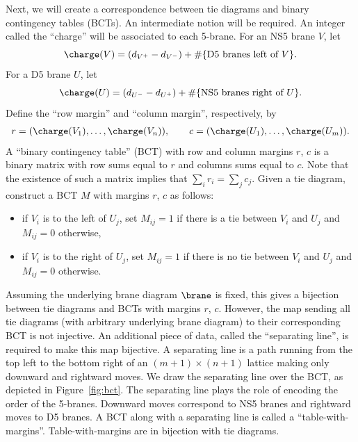 Next, we will create a correspondence between tie diagrams and binary contingency tables (BCTs). An intermediate notion will be required. An integer called the ``charge'' will be associated to each 5-brane.
For an NS5 brane $V$, let
\[
\charge(V)=
(d_{V^+}-d_{V^-})+\#\{\text{D5 branes left of $V$}\}.
\]
For a D5 brane $U$, let
\[
\charge(U)=
(d_{U^-}-d_{U^+})+\#\{\text{NS5 branes right of $U$}\}.
\]
Define the ``row margin'' and ``column margin'', respectively, by
\begin{align*}
r = (\charge(V_1), \dots , \charge(V_n)), \qquad
c = (\charge(U_1), \dots , \charge(U_m)).
\end{align*}
A ``binary contingency table'' (BCT) with row and column margins $r$, $c$ is a binary matrix with row sums equal to $r$ and columns sums equal to $c$. Note that the existence of such a matrix implies that $\sum_i r_i = \sum_j c_j$. Given a tie diagram, construct a BCT $M$ with margins $r$, $c$ as follows:
\begin{itemize}\itemsep=0pt
\item if $V_i$ is to the left of $U_j$, set $M_{ij} = 1$ if there is a tie between $V_i$ and $U_j$ and $M_{ij} = 0$ otherwise,
\item if $V_i$ is to the right of $U_j$, set $M_{ij} = 1$ if there is no tie between $V_i$ and $U_j$ and $M_{ij} = 0$ otherwise.
\end{itemize}
Assuming the underlying brane diagram $\brane$ is fixed, this gives a bijection between tie diagrams and BCTs with margins $r$, $c$. However, the map sending all tie diagrams (with arbitrary underlying brane diagram) to their corresponding BCT is not injective. An additional piece of data, called the ``separating line'', is required to make this map bijective. A separating line is a path running from the top left to the bottom right of an $(m + 1) \times (n + 1)$ lattice making only downward and rightward moves. We draw the separating line over the BCT, as depicted in Figure~\ref{fig:bct}. The separating line plays the role of encoding the order of the 5-branes. Downward moves correspond to NS5 branes and rightward moves to D5 branes. A BCT along with a separating line is called a ``table-with-margins''. Table-with-margins are in bijection with tie diagrams.

